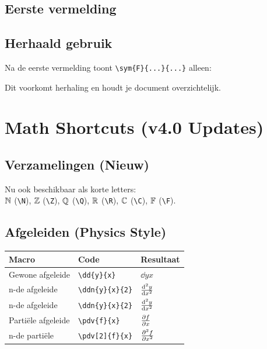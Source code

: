 \documentclass[a4paper,11pt]{article}
\begin{document}
\subsection{Eerste vermelding}



\subsection{Herhaald gebruik}

Na de eerste vermelding toont \verb|\sym{F}{...}{...}| alleen: 

Dit voorkomt herhaling en houdt je document overzichtelijk.

\section{Math Shortcuts (v4.0 Updates)}
\label{sec:math}

\subsection{Verzamelingen (Nieuw)}
Nu ook beschikbaar als korte letters: \\
$\mathbb{N}$ (\verb|\N|), $\mathbb{Z}$ (\verb|\Z|), $\mathbb{Q}$ (\verb|\Q|), $\mathbb{R}$ (\verb|\R|), $\mathbb{C}$ (\verb|\C|), $\mathbb{F}$ (\verb|\F|).

\subsection{Afgeleiden (Physics Style)}

\begin{tabular}{lll}
\toprule
\textbf{Macro} & \textbf{Code} & \textbf{Resultaat} \\
\midrule
Gewone afgeleide & \verb|\dd{y}{x}| & $\dd{y}{x}$ \\
n-de afgeleide & \verb|\ddn{y}{x}{2}| & $\frac{\mathrm{d}^{2} y}{\mathrm{d} x^{2}}$ \\
n-de afgeleide & \verb|\ddn{y}{x}{2}| & $\frac{\mathrm{d}^{2} y}{\mathrm{d} x^{2}}$ \\
Partiële afgeleide & \verb|\pdv{f}{x}| & $\pdv{f}{x}$ \\
n-de partiële & \verb|\pdv[2]{f}{x}| & $\pdv[2]{f}{x}$ \\
\bottomrule
\end{tabular}
\end{document}
